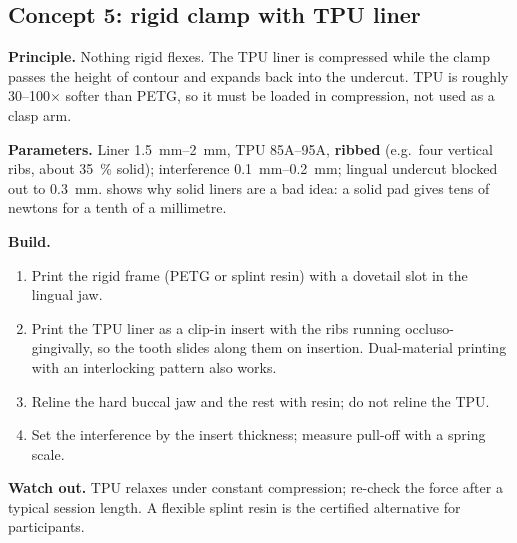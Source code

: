 \subsection{Concept 5: rigid clamp with TPU liner}
\textbf{Principle.} Nothing rigid flexes. The TPU liner is compressed while the clamp passes the
height of contour and expands back into the undercut. TPU is roughly 30--100$\times$ softer than
PETG, so it must be loaded in compression, not used as a clasp arm.

\textbf{Parameters.} Liner \SIrange{1.5}{2}{mm}, TPU 85A--95A, \textbf{ribbed} (e.g.\ four vertical
ribs, about \SI{35}{\percent} solid); interference \SIrange{0.1}{0.2}{mm}; lingual undercut
blocked out to \SI{0.3}{mm}.  shows why solid liners are a bad idea: a solid pad
gives tens of newtons for a tenth of a millimetre.

\textbf{Build.}
\begin{enumerate}
\item Print the rigid frame (PETG or splint resin) with a dovetail slot in the lingual jaw.
\item Print the TPU liner as a clip-in insert with the ribs running occluso-gingivally, so the
tooth slides along them on insertion. Dual-material printing with an interlocking pattern also
works.
\item Reline the hard buccal jaw and the rest with resin; do not reline the TPU.
\item Set the interference by the insert thickness; measure pull-off with a spring scale.
\end{enumerate}
\textbf{Watch out.} TPU relaxes under constant compression; re-check the force after a typical
session length. A flexible splint resin is the certified alternative for participants.
